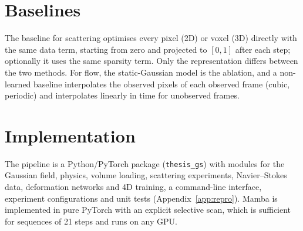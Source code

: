 \section{Baselines}
The baseline for scattering optimises every pixel (2D) or voxel (3D) directly with the same data term, starting from
zero and projected to $[0,1]$ after each step; optionally it uses the same sparsity term. Only the representation
differs between the two methods. For flow, the static-Gaussian model is the ablation, and a non-learned baseline interpolates the observed pixels of
each observed frame (cubic, periodic) and interpolates linearly in time for unobserved frames.

\section{Implementation}
The pipeline is a Python/PyTorch package (\texttt{thesis\_gs}) with modules for the Gaussian field, physics,
volume loading, scattering experiments, Navier--Stokes data, deformation networks and 4D training, a command-line
interface, experiment configurations and unit tests (Appendix~\ref{app:repro}). Mamba is implemented in pure PyTorch
with an explicit selective scan, which is sufficient for sequences of 21 steps and runs on any GPU.
